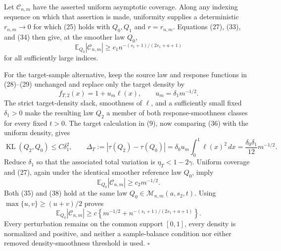 Let \(\mathcal C_{n,m}\) have the asserted uniform asymptotic coverage. Along any indexing sequence on which that assertion is made, uniformity supplies a deterministic \(r_{n,m}\to0\) for which (25) holds with \(Q_0,Q_1\) and \(r=r_{n,m}\). Equations (27), (33), and (34) then give, at the smoother law \(Q_0\),
\[
\mathbb E_{Q_0}|\mathcal C_{n,m}|
\ge c_1n^{-(s_1+1)/(2s_1+a+1)}
\tag{35}
\]
for all sufficiently large indices.

For the target-sample alternative, keep the source law and response functions in (28)--(29) unchanged and replace only the target density by
\[
f_{T,2}(x)=1+u_m\ell(x),
\qquad
u_m=\delta_1m^{-1/2}.
\tag{36}
\]
The strict target-density slack, smoothness of \(\ell\), and a sufficiently small fixed \(\delta_1>0\) make the resulting law \(Q_2\) a member of both response-smoothness classes for every fixed \(t>0\). The target calculation in (9), now comparing (36) with the uniform density, gives
\[
\operatorname{KL}(Q_2,Q_0)\le C\delta_1^2,
\qquad
\Delta_T:=|\tau(Q_2)-\tau(Q_0)|
=\delta_0u_m\int_0^1\ell(x)^2\,dx
=\frac{\delta_0\delta_1}{12}m^{-1/2}.
\tag{37}
\]
Reduce \(\delta_1\) so that the associated total variation is \(\eta_T<1-2\gamma\). Uniform coverage and (27), again under the identical smoother reference law \(Q_0\), imply
\[
\mathbb E_{Q_0}|\mathcal C_{n,m}|\ge c_2m^{-1/2}.
\tag{38}
\]
Both (35) and (38) hold at the same law \(Q_0\in\mathcal M_{n,m}(a,s_2,t)\). Using \(\max\{u,v\}\ge(u+v)/2\) proves
\[
\mathbb E_{Q_0}|\mathcal C_{n,m}|
\ge c\left\{m^{-1/2}+n^{-(s_1+1)/(2s_1+a+1)}\right\}.
\]
Every perturbation remains on the common support \([0,1]\), every density is normalized and positive, and neither a sample-balance condition nor either removed density-smoothness threshold is used. \(\square\)